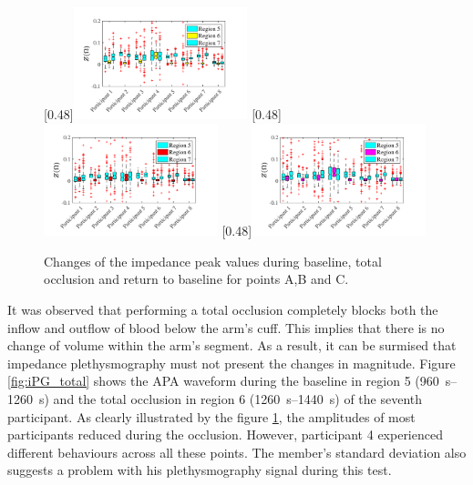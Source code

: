 \begin{figure}
	\null\hfill%
	[0.48\textwidth]{\includegraphics[width=0.45\textwidth, trim={0.5cm 0cm 1.5cm 0 cm}, clip]{figure_apa_7a}}%
	\hfill%
	[0.48\textwidth]{\includegraphics[width=0.45\textwidth, trim={0.5cm 0cm 1.5cm 0 cm}, clip]{figure_apa_7b}}%
	\hfill%
	[0.48\textwidth]{\includegraphics[width=0.45\textwidth, trim={0.5cm 0cm 1.5cm 0 cm}, clip]{figure_apa_7c}}%
	\null%
	\caption{Changes of the impedance peak values during baseline, total occlusion and return to baseline for points A,B and C.}
	\label{fig:iPG_change_points_total}
\end{figure}

It was observed that performing a total occlusion completely blocks both the inflow and outflow of blood below the arm's cuff.  This implies that there is no change of volume within the arm's segment. As a result, it can be surmised that impedance plethysmography must not present the changes in magnitude.  Figure \ref{fig:iPG_total} shows the APA waveform during the baseline in region 5 (\SIrange{960}{1260}{\second}) and the total occlusion in region 6 (\SIrange{1260}{1440}{\second}) of the seventh participant. As clearly illustrated by the figure \ref{fig:iPG_change_points_total}, the amplitudes of most participants reduced during the occlusion. However, participant 4 experienced different behaviours across all these points. The member's standard deviation also suggests a problem with his plethysmography signal during this test. 

